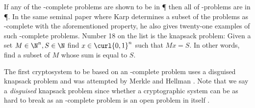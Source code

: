 \documentclass{homework}
\begin{document}
If any of the \NP-complete problems are shown to be in \P{} then all
of \NP-problems are in \P. In the same seminal paper
\cite{karp1972reducibility} where Karp determines a subset of the
\NP{} problems as \NP-complete with the aforementioned property, he
also gives twenty-one examples of such \NP-complete problems. Number
18 on the list is the knapsack problem: Given a set
$M \in \N^n, S \in \N$ find $x \in \curl{0, 1}^n$ such that $Mx =
  S$. In other words, find a subset of $M$ whose sum is equal to $S$.

The first cryptosystem to be based on an \NP-complete problem uses a
disguised knapsack problem \cite{hoffstein2008introduction} and was
attempted by Merkle and Hellman \cite{merkle2019hiding}. Note that we
say a \textit{disguised} knapsack problem since whether a
cryptographic system can be as hard to break as an \NP-complete
problem is an open problem in itself \cite{pass2006parallel}.
\end{document}
